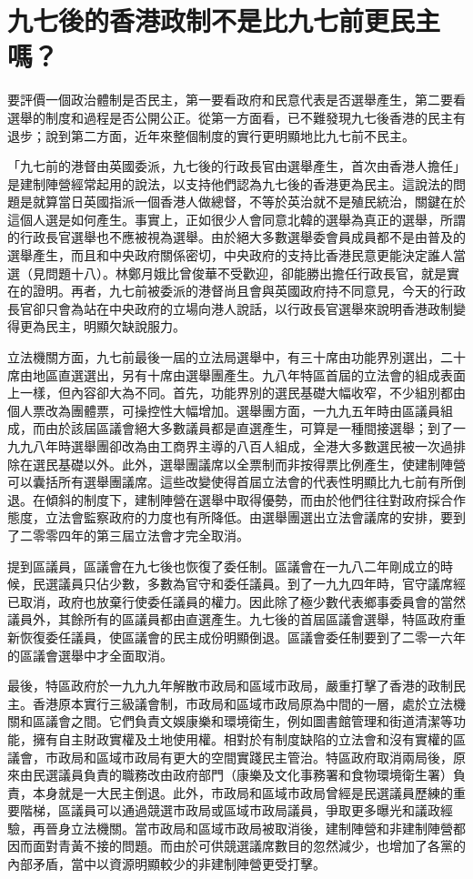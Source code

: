 \section{九七後的香港政制不是比九七前更民主嗎？}

要評價一個政治體制是否民主，第一要看政府和民意代表是否選舉產生，第二要看選舉的制度和過程是否公開公正。從第一方面看，已不難發現九七後香港的民主有退步；說到第二方面，近年來整個制度的實行更明顯地比九七前不民主。

「九七前的港督由英國委派，九七後的行政長官由選舉產生，首次由香港人擔任」是建制陣營經常起用的說法，以支持他們認為九七後的香港更為民主。這說法的問題是就算當日英國指派一個香港人做總督，不等於英治就不是殖民統治，關鍵在於這個人選是如何產生。事實上，正如很少人會同意北韓的選舉為真正的選舉，所謂的行政長官選舉也不應被視為選舉。由於絕大多數選舉委會員成員都不是由普及的選舉產生，而且和中央政府關係密切，中央政府的支持比香港民意更能決定誰人當選（見問題十八）。林鄭月娥比曾俊華不受歡迎，卻能勝出擔任行政長官，就是實在的證明。再者，九七前被委派的港督尚且會與英國政府持不同意見，今天的行政長官卻只會為站在中央政府的立場向港人說話，以行政長官選舉來說明香港政制變得更為民主，明顯欠缺說服力。

立法機關方面，九七前最後一屆的立法局選舉中，有三十席由功能界別選出，二十席由地區直選選出，另有十席由選舉團產生。九八年特區首屆的立法會的組成表面上一樣，但內容卻大為不同。首先，功能界別的選民基礎大幅收窄，不少組別都由個人票改為團體票，可操控性大幅增加。選舉團方面，一九九五年時由區議員組成，而由於該屆區議會絕大多數議員都是直選產生，可算是一種間接選舉；到了一九九八年時選舉團卻改為由工商界主導的八百人組成，全港大多數選民被一次過排除在選民基礎以外。此外，選舉團議席以全票制而非按得票比例產生，使建制陣營可以囊括所有選舉團議席。這些改變使得首屆立法會的代表性明顯比九七前有所倒退。在傾斜的制度下，建制陣營在選舉中取得優勢，而由於他們往往對政府採合作態度，立法會監察政府的力度也有所降低。由選舉團選出立法會議席的安排，要到了二零零四年的第三屆立法會才完全取消。

提到區議員，區議會在九七後也恢復了委任制。區議會在一九八二年剛成立的時候，民選議員只佔少數，多數為官守和委任議員。到了一九九四年時，官守議席經已取消，政府也放棄行使委任議員的權力。因此除了極少數代表鄉事委員會的當然議員外，其餘所有的區議員都由直選產生。九七後的首屆區議會選舉，特區政府重新恢復委任議員，使區議會的民主成份明顯倒退。區議會委任制要到了二零一六年的區議會選舉中才全面取消。

最後，特區政府於一九九九年解散市政局和區域市政局，嚴重打擊了香港的政制民主。香港原本實行三級議會制，市政局和區域市政局原為中間的一層，處於立法機關和區議會之間。它們負責文娛康樂和環境衛生，例如圖書館管理和街道清潔等功能，擁有自主財政實權及土地使用權。相對於有制度缺陷的立法會和沒有實權的區議會，市政局和區域市政局有更大的空間實踐民主管治。特區政府取消兩局後，原來由民選議員負責的職務改由政府部門（康樂及文化事務署和食物環境衛生署）負責，本身就是一大民主倒退。此外，市政局和區域市政局曾經是民選議員歷練的重要階梯，區議員可以通過競選市政局或區域市政局議員，爭取更多曝光和議政經驗，再晉身立法機關。當市政局和區域市政局被取消後，建制陣營和非建制陣營都因而面對青黃不接的問題。而由於可供競選議席數目的忽然減少，也增加了各黨的內部矛盾，當中以資源明顯較少的非建制陣營更受打擊。

